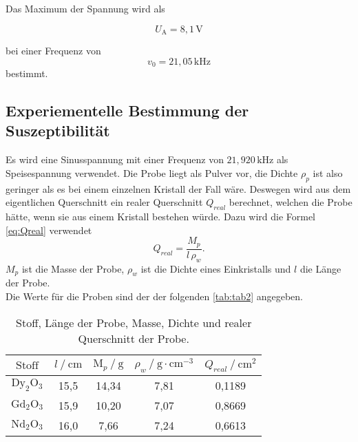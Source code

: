 Das Maximum der Spannung wird als

\begin{equation}
    U_\text{A} = 8,1 \, \unit{\volt}
\end{equation}

bei einer Frequenz von 
\begin{equation}
    v_0 = 21,05 \, \unit{\kilo\hertz}
\end{equation}
bestimmt.



\subsection{Experiementelle Bestimmung der Suszeptibilität}

Es wird eine Sinusspannung mit einer Frequenz von $ 21,920 \, \unit{\kilo\hertz}$ als Speisespannung verwendet.
Die Probe liegt als Pulver vor, die Dichte $ \rho_p$ ist also geringer als es bei einem einzelnen Kristall der Fall wäre.
Deswegen wird aus dem eigentlichen Querschnitt ein realer Querschnitt $Q_{real} $ berechnet, welchen die Probe hätte, wenn sie aus einem Kristall bestehen würde.
Dazu wird die Formel \eqref{eq:Qreal} verwendet
\begin{equation}
    Q_{real} = \frac{M_p}{l \, \rho_w} .
    \label{eq:Qreal}
\end{equation}
$M_p$ ist die Masse der Probe, $\rho_w$ ist die Dichte eines Einkristalls und $l$ die Länge der Probe. \\

Die Werte für die Proben sind der der folgenden \autoref{tab:tab2} angegeben.


\begin{table}[H]
    \centering
    \caption{Stoff, Länge der Probe, Masse, Dichte und realer Querschnitt der Probe.}
    \label{tab:tab2}
    \begin{tabular}{S S S S S}
      \toprule
        {$\text{Stoff}$}&{$l \mathbin{/} \unit{\centi\meter} $}&{$\text{M}_p \mathbin{/} \unit{\gram} $}&{$ \rho_w \mathbin{/} \unit{\gram} \cdot \unit{\centi\meter}^{-3}$}&{$Q_{real} \mathbin{/} \unit{\centi\meter}^{2}$}\\
        \midrule
        {$\text{Dy}_2 \text{O}_3$} & {15,5}& {14,34}&{7,81\cite{ap07}}&{0,1189}\\
        {$\text{Gd}_2 \text{O}_3$} & {15,9}& {10,20}&{7,07\cite{ap07}}&{0,8669}\\
        {$\text{Nd}_2 \text{O}_3$} & {16,0}& {7,66 }&{7,24\cite{ap07}}&{0,6613}\\
      \bottomrule
    \end{tabular}
\end{table}


